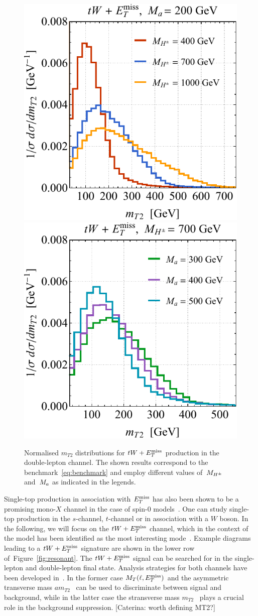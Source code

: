 \begin{figure}[t!]
\centering
\includegraphics[height=0.45\textwidth]{texinputs/04_grid/newfigures/mt2l.pdf} \qquad 
\includegraphics[height=0.45\textwidth]{texinputs/04_grid/newfigures/mt2r.pdf}
\vspace{2mm}
\caption{\label{fig:mt2spectra} Normalised $m_{T2}$ distributions for $tW+E_T^\mathrm{miss}$ production in the double-lepton channel.  The shown results correspond to the \hdma benchmark~\eqref{eq:benchmark} and employ different values of~$M_{H^{\pm}}$ and~$M_{a}$ as indicated in the legends.}
\end{figure}

Single-top production in association with $E_T^\mathrm{miss}$ has also been shown to be a promising mono-$X$ channel in the case of spin-0 models~\cite{Pinna:2017tay,Pani:2017qyd,Plehn:2017bys}. One can study single-top production in the $s$-channel, $t$-channel  or  in association with a $W$ boson. In the following, we will focus on the $tW + E_T^\mathrm{miss}$ channel, which in the context of the \hdma model has been identified as the most interesting mode~\cite{Pani:2017qyd}. Example diagrams leading to a $tW + E_T^\mathrm{miss}$ signature are shown in the lower row of~Figure~\ref{fig:resonant}. The $tW + E_T^\mathrm{miss}$ signal can be searched for in the single-lepton and double-lepton final state. Analysis strategies for both channels have been developed in~\cite{Pani:2017qyd}. In the former case $M_T (\ell, E_T^\mathrm{miss})$ and the asymmetric transverse mass $am_{T2}$~\cite{Konar:2009qr,Lester:2014yga} can be used to discriminate between signal and background, while in the latter case the stransverse mass $m_{T2}$~\cite{Lester:1999tx,Barr:2003rg} plays a crucial role in the background suppression. \color{red}[Caterina: worth defining MT2?]\color{black}


